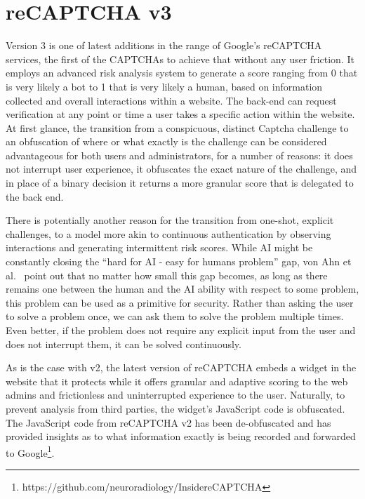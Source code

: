 \section{reCAPTCHA v3}
\label{sec:recap}

Version 3 is one of latest additions in the range of Google's reCAPTCHA services, the first of the CAPTCHAs to achieve that without any user friction.
It employs an advanced risk analysis system to generate a score ranging from 0 that is very likely a bot to 1 that is very likely a human, based on information collected and overall interactions within a website.
The back-end can request verification at any point or time a user takes a specific action within the website.
At first glance, the transition from a conspicuous, distinct Captcha challenge to an obfuscation of where or what exactly is the challenge can be considered advantageous for both users and administrators, for a number of reasons: it does not interrupt user experience, it obfuscates the exact nature of the challenge, and in place of a binary decision it returns a more granular score that is delegated to the back end.

There is potentially another reason for the transition from one-shot, explicit challenges, to a model more akin to continuous authentication by observing interactions and generating intermittent risk scores.
While \gls{AI} might be constantly closing the ``hard for AI - easy for humans problem'' gap, von Ahn et al.~\cite{von2003captcha} point out that no matter how small this gap becomes, as long as there remains one between the human and the AI ability with respect to some problem, this problem can be used as a primitive for security.
Rather than asking the user to solve a problem once, we can ask them to solve the problem multiple times.
Even better, if the problem does not require any explicit input from the user and does not interrupt them, it can be solved continuously.

As is the case with v2, the latest version of reCAPTCHA embeds a widget in the website that it protects while it offers granular and adaptive scoring to the web admins and frictionless and uninterrupted experience to the user.
Naturally, to prevent analysis from third parties, the widget's JavaScript code is obfuscated.
The JavaScript code from reCAPTCHA v2 has been de-obfuscated and has provided insights as to what information exactly is being recorded and forwarded to Google\footnote{https://github.com/neuroradiology/InsidereCAPTCHA}.

